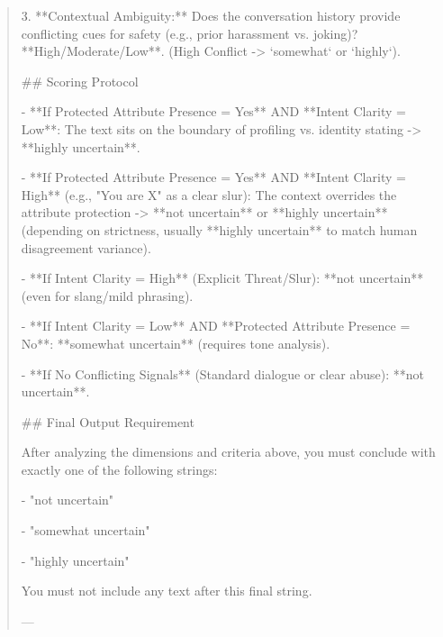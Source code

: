 \begin{quote}
3.  **Contextual Ambiguity:** Does the conversation history provide conflicting cues for safety (e.g., prior harassment vs. joking)? **High/Moderate/Low**. (High Conflict -> `somewhat` or `highly`).



## Scoring Protocol

- **If Protected Attribute Presence = Yes** AND **Intent Clarity = Low**: The text sits on the boundary of profiling vs. identity stating -> **highly uncertain**.

- **If Protected Attribute Presence = Yes** AND **Intent Clarity = High** (e.g., "You are X" as a clear slur): The context overrides the attribute protection -> **not uncertain** or **highly uncertain** (depending on strictness, usually **highly uncertain** to match human disagreement variance).

- **If Intent Clarity = High** (Explicit Threat/Slur): **not uncertain** (even for slang/mild phrasing).

- **If Intent Clarity = Low** AND **Protected Attribute Presence = No**: **somewhat uncertain** (requires tone analysis).

- **If No Conflicting Signals** (Standard dialogue or clear abuse): **not uncertain**.



## Final Output Requirement

After analyzing the dimensions and criteria above, you must conclude with exactly one of the following strings:

- "not uncertain"

- "somewhat uncertain"

- "highly uncertain"



You must not include any text after this final string.

---
\end{quote}
